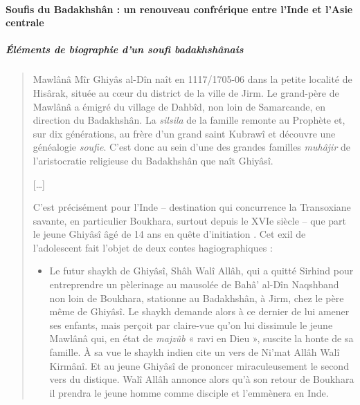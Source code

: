 
 



 



\paragraph{Soufis du Badakhshân : un renouveau confrérique entre
l'Inde et l'Asie centrale}
 
 
\subparagraph{Éléments de biographie d'un soufi
badakhshânais} 
\begin{quote}
Mawlânâ Mîr Ghiyâs al-Dîn \label{Theo:MawlanaMirGhiyasAlDin} naît en 1117/1705-06 dans la petite localité
de Hisârak, située au cœur du district de la ville de Jirm. Le
grand-père de Mawlânâ a émigré du village de Dahbîd, non loin de
Samarcande, en direction du Badakhshân. La \emph{silsila} de la famille
remonte au Prophète et, sur dix générations, au frère d'un grand saint
Kubrawî et découvre une généalogie \textit{soufie}. C'est donc au sein d'une des
grandes familles \emph{muhâjir} de l'aristocratie religieuse du
Badakhshân que naît Ghiyâsî.

{[}\ldots{]}

C'est précisément pour l'Inde -- destination qui concurrence la
Transoxiane savante, en particulier Boukhara, surtout depuis le XVIe
siècle -- que part le jeune Ghiyâsî âgé de 14 ans en quête d'initiation .
Cet exil de l'adolescent fait l'objet de deux contes hagiographiques :
 

\begin{itemize}
\item
 
  Le futur shaykh de Ghiyâsî, Shâh Walî Allâh, qui a quitté Sirhind pour
  entreprendre un pèlerinage au mausolée de Bahâ' al-Dîn Naqshband non
  loin de Boukhara, stationne au Badakhshân, à Jirm, chez le père même
  de Ghiyâsî. Le shaykh demande alors à ce dernier de lui amener ses
  enfants, mais perçoit par claire-vue qu'on lui dissimule le jeune
  Mawlânâ qui, en état de \emph{majzûb} « ravi en Dieu », suscite la honte de
  sa famille. À sa vue le shaykh indien cite un vers de Ni'mat Allâh
  Walî Kirmânî. Et au jeune Ghiyâsî de prononcer miraculeusement le
  second vers du distique. Walî Allâh annonce alors qu'à son retour de
  Boukhara il prendra le jeune homme comme disciple et l'emmènera en
  Inde.
  

\end{itemize}
\end{quote}
